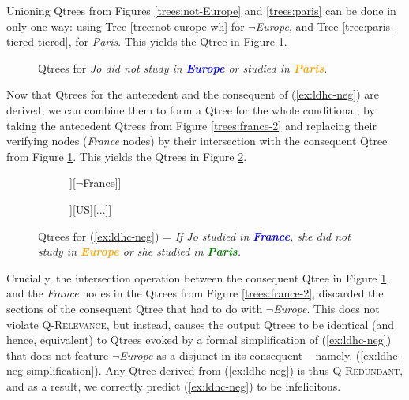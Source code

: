 Unioning Qtrees from Figures \ref{trees:not-Europe} and \ref{trees:paris} can be done in only one way: using Tree \ref{tree:not-europe-wh} for $\neg$\textit{Europe}, and Tree \ref{tree:paris-tiered-tiered}, for \textit{Paris}. This yields the Qtree in Figure \ref{tree:not-europe-or-paris}.

\begin{figure}[H]
	\centering
	\caption{Qtrees for \textit{Jo did not study in \textbf{\textcolor{blue}{Europe}} or studied in \textbf{\textcolor{orange}{Paris}}.}}\label{tree:not-europe-or-paris}
\end{figure}

Now that Qtrees for the antecedent and the consequent of (\ref{ex:ldhc-neg}) are derived, we can combine them to form a Qtree for the whole conditional, by taking the antecedent Qtrees from Figure \ref{trees:france-2} and replacing their verifying nodes (\textit{France} nodes) by their intersection with the consequent Qtree from Figure \ref{tree:not-europe-or-paris}. This yields the Qtrees in Figure \ref{trees:if-france-then-not-europe-or-paris}. 

\begin{figure}[H]
	\centering
	\begin{subfigure}[b]{.3\linewidth}
		\centering
		\begin{forest}
			[CS[{France}[\fbox{Paris}][Nice][...]][$\neg$France]]
		\end{forest}
		\caption{}
	\end{subfigure}
	\qquad
	\begin{subfigure}[b]{.3\linewidth}
		\centering
		\begin{forest}
			[CS[{France}[\fbox{Paris}][Nice][...]][US][...]]
		\end{forest}
		\caption{}
	\end{subfigure}
	\caption{Qtrees for (\ref{ex:ldhc-neg}) = \textit{If Jo studied in \textcolor{blue}{\textbf{France}}, she did not study in \textcolor{orange}{\textbf{Europe}} or she studied in \textcolor{green}{\textbf{Paris}}.}} \label{trees:if-france-then-not-europe-or-paris}
\end{figure}

Crucially, the intersection operation between the consequent Qtree in Figure \ref{tree:not-europe-or-paris}, and the \textit{France} nodes in the Qtrees from Figure \ref{trees:france-2}, discarded the sections of the consequent Qtree that had to do with $\neg$\textit{Europe}. This does not violate \textsc{Q-Relevance}, but instead, causes the output Qtrees to be identical (and hence, equivalent) to Qtrees evoked by a formal simplification of (\ref{ex:ldhc-neg}) that does not feature $\neg$\textit{Europe} as a disjunct in its consequent -- namely, (\ref{ex:ldhc-neg-simplification}). Any Qtree derived from (\ref{ex:ldhc-neg}) is thus \textsc{Q-Redundant}, and as a result, we correctly predict (\ref{ex:ldhc-neg}) to be infelicitous.\\


